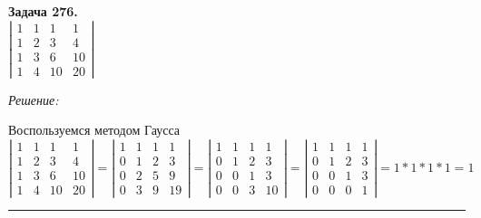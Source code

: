 \documentclass[a4paper, 12pt]{article}
\newenvironment{problem}[2][Задача]
    { \begin{mdframed}[backgroundcolor=gray!10] \textbf{#1 #2.} \\}
    {  \end{mdframed}}
\newenvironment{solution}
    {\textit{Решение: }}
    {\noindent\rule{7in}{1.5pt}}
\begin{document}
\begin{problem}{276}
$\left| \begin{array}{rrrr}1 & 1 & 1 & 1 \\ 1 & 2 & 3 & 4 \\ 1 & 3 & 6 & 10 \\ 1 & 4 & 10 & 20 \end{array} \right|$
\end{problem}
\begin{solution}

Воспользуемся методом Гаусса \\
$
\left|
\begin{array}{rrrr}
1 & 1 & 1 & 1 \\
1 & 2 & 3 & 4 \\
1 & 3 & 6 & 10 \\
1 & 4 & 10 & 20
\end{array}
\right|
=
\left|
\begin{array}{rrrr}
1 & 1 & 1 & 1 \\
0 & 1 & 2 & 3 \\
0 & 2 & 5 & 9 \\
0 & 3 & 9 & 19
\end{array}
\right|
=
\left|
\begin{array}{rrrr}
1 & 1 & 1 & 1 \\
0 & 1 & 2 & 3 \\
0 & 0 & 1 & 3 \\
0 & 0 & 3 & 10
\end{array}
\right|
=
\left|
\begin{array}{rrrr}
1 & 1 & 1 & 1 \\
0 & 1 & 2 & 3 \\
0 & 0 & 1 & 3 \\
0 & 0 & 0 & 1
\end{array}
\right|
=
1 * 1 * 1 * 1 = 1
$

\end{solution}
\end{document}
